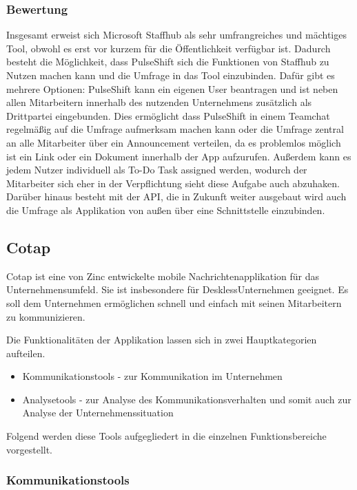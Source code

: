 \subsubsection{Bewertung}
Insgesamt erweist sich Microsoft Staffhub als sehr umfrangreiches und mächtiges Tool, obwohl es erst vor kurzem für die Öffentlichkeit verfügbar ist. Dadurch besteht die Möglichkeit, dass PulseShift sich die Funktionen von Staffhub zu Nutzen machen kann und die Umfrage in das Tool einzubinden. Dafür gibt es mehrere Optionen: PulseShift kann ein eigenen User beantragen und ist neben allen Mitarbeitern innerhalb des nutzenden Unternehmens zusätzlich als Drittpartei eingebunden. Dies ermöglicht dass PulseShift in einem Teamchat regelmäßig auf die Umfrage aufmerksam machen kann oder die Umfrage zentral an alle Mitarbeiter über ein Announcement verteilen, da es problemlos möglich ist ein Link oder ein Dokument innerhalb der App aufzurufen. Außerdem kann es jedem Nutzer individuell als To-Do Task assigned werden, wodurch der Mitarbeiter sich eher in der Verpflichtung sieht diese Aufgabe auch abzuhaken.
Darüber hinaus besteht mit der API, die in Zukunft weiter ausgebaut wird auch die Umfrage als Applikation von außen über eine Schnittstelle einzubinden.

\subsection{Cotap}
Cotap ist eine von Zinc entwickelte mobile Nachrichtenapplikation für das Unternehmensumfeld. Sie ist insbesondere für \glqq Deskless\grqq Unternehmen geeignet. Es soll dem Unternehmen ermöglichen schnell und einfach mit seinen Mitarbeitern zu kommunizieren. 

Die Funktionalitäten der Applikation lassen sich in zwei Hauptkategorien aufteilen. 

\begin{itemize}
\item Kommunikationstools - zur Kommunikation im Unternehmen 
\item Analysetools - zur Analyse des Kommunikationsverhalten und somit auch zur Analyse der Unternehmenssituation
\end{itemize}

Folgend werden diese Tools aufgegliedert in die einzelnen Funktionsbereiche vorgestellt.

\subsubsection{Kommunikationstools}

